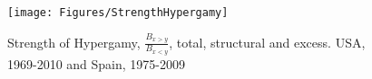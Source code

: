 \begin{figure}[!ht]
  \centering
    \caption{Strength of Hypergamy, $\frac{B_{x>y}}{B_{x<y}}$, total, structural
    and excess. USA, 1969-2010 and Spain, 1975-2009}
    \texttt{[image: Figures/StrengthHypergamy]}      
    \label{fig:HypergamyStrength}
\end{figure}










